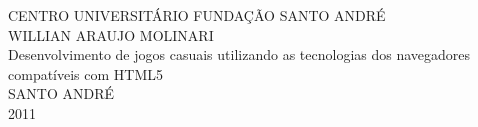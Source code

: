 \thispagestyle{empty}
\vspace{3cm}
\begin{center}
\large CENTRO UNIVERSITÁRIO FUNDAÇÃO SANTO ANDRÉ \\
\vspace{1cm}
\large WILLIAN ARAUJO MOLINARI \\
\vspace{8cm}
\huge Desenvolvimento de jogos casuais utilizando as tecnologias dos navegadores compatíveis com HTML5 \\
\vspace{8cm}
\large SANTO ANDRÉ \\
\large 2011 \\
\end{center}
